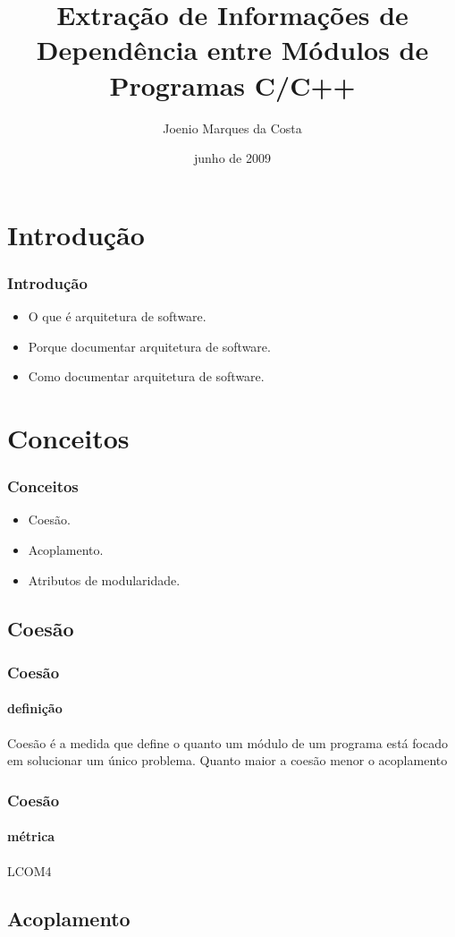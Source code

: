 \documentclass{beamer}
\title[Universidade Católica do Salvador]{Extração de Informações de Dependência entre Módulos de Programas C/C++}
\author[Joenio Costa]{Joenio Marques da Costa}
\institute{UCSal - Universidade Católica do Salvador}
\date{junho de 2009}
\begin{document}
\frame{\titlepage} %

\begin{frame}
 \tableofcontents
\end{frame}

\section{Introdução}

\begin{frame}
\frametitle{Introdução}
  \begin{itemize}
  \item<1-> O que é arquitetura de software.
  \item<1-> Porque documentar arquitetura de software.
  \item<1-> Como documentar arquitetura de software.
  \end{itemize}
\end{frame}

\section{Conceitos}

\begin{frame}
\frametitle{Conceitos}
  \begin{itemize}
  \item<1-> Coesão.
  \item<1-> Acoplamento.
  \item<1-> Atributos de modularidade.
  \end{itemize}
\end{frame}

\subsection{Coesão}

\begin{frame}
\frametitle{Coesão}
\framesubtitle{definição}
Coesão é a medida que define o quanto um módulo de um programa está focado em
solucionar um único problema. Quanto maior a coesão menor o acoplamento
\end{frame}

\begin{frame}
\frametitle{Coesão}
\framesubtitle{métrica}
LCOM4
\end{frame}

\subsection{Acoplamento}
\end{document}
